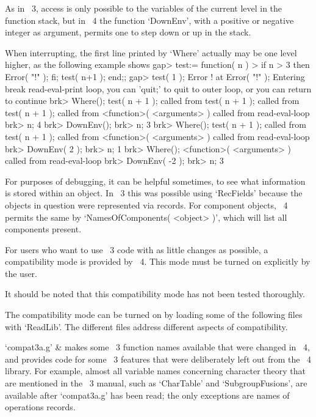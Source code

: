 As in {\GAP}~3, access is only possible to the variables of the current
level in the function stack,
but in {\GAP}~4 the function `DownEnv', with a positive or negative
integer as argument, permits one to step down or up in the
stack.

When interrupting, the first line printed by `Where' actually may be
one level higher, as the following example shows
\begintt
gap> test:= function( n )
>    if n > 3 then Error( "!" ); fi; test( n+1 ); end;;
gap> test( 1 );
Error ! at
Error( "!" );
Entering break read-eval-print loop,
you can 'quit;' to quit to outer loop,
or you can return to continue
brk> Where();
test( n + 1 ); called from
test( n + 1 ); called from
test( n + 1 ); called from
<function>( <arguments> ) called from read-eval-loop
brk> n;
4
brk> DownEnv();
brk> n;
3
brk> Where();
test( n + 1 ); called from
test( n + 1 ); called from
<function>( <arguments> ) called from read-eval-loop
brk> DownEnv( 2 );
brk> n;
1
brk> Where();
<function>( <arguments> ) called from read-eval-loop
brk> DownEnv( -2 );
brk> n;
3
\endtt

For purposes of debugging, it can be helpful sometimes, to see what
information is stored within an object. In {\GAP}~3 this was possible using
`RecFields' because the objects in question were represented via records.
For component objects, {\GAP}~4 permits the same by
`NamesOfComponents( <object> )', which will list all components present.



For users who want to use {\GAP}~3 code with as little changes as
possible, a compatibility mode is provided by {\GAP}~4.
This mode must be turned on explicitly by the user.

It should be noted that this compatibility mode has not been tested
thoroughly.

The compatibility mode can be turned on by loading some of the following
files with `ReadLib'.
The different files address different aspects of compatibility.

\beginitems
`compat3a.g' &
    makes some {\GAP}~3 function names available that were changed
    in {\GAP}~4,
    and provides code for some {\GAP}~3 features that were
    deliberately left out from the {\GAP}~4 library.
    For example,
    almost all variable names concerning character theory that are
    mentioned in the {\GAP}~3 manual,
    such as `CharTable' and `SubgroupFusions',
    are available after `compat3a.g' has been read;
    the only exceptions are names of operations records.

